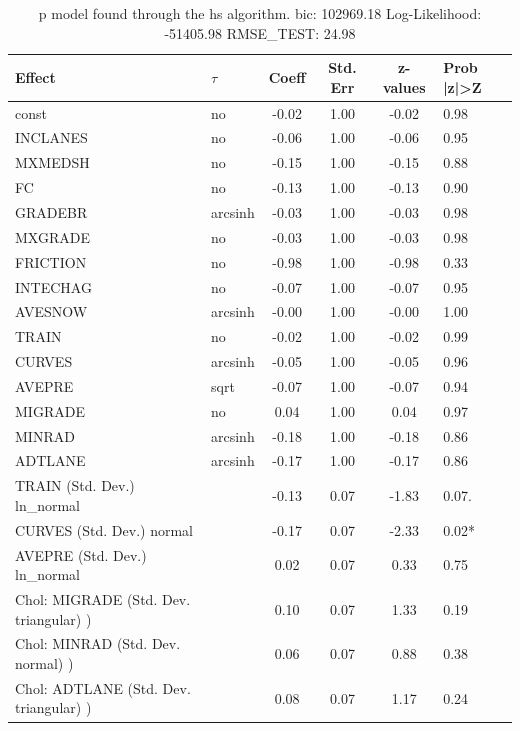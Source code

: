 \begin{table}
	\caption{p model found through the hs algorithm. bic: 102969.18 Log-Likelihood: -51405.98 RMSE_TEST: 24.98}
	\begin{center}
		\begin{tabular}{|l|l|c|c|c|l|}
			\hline
			Effect & $\tau$ & Coeff & Std. Err & z-values & Prob |z|>Z \\
			\hline
			const & no & -0.02 & 1.00 & -0.02 & 0.98 \\
			\hline
			INCLANES & no & -0.06 & 1.00 & -0.06 & 0.95 \\
			\hline
			MXMEDSH & no & -0.15 & 1.00 & -0.15 & 0.88 \\
			\hline
			FC & no & -0.13 & 1.00 & -0.13 & 0.90 \\
			\hline
			GRADEBR & arcsinh & -0.03 & 1.00 & -0.03 & 0.98 \\
			\hline
			MXGRADE & no & -0.03 & 1.00 & -0.03 & 0.98 \\
			\hline
			FRICTION & no & -0.98 & 1.00 & -0.98 & 0.33 \\
			\hline
			INTECHAG & no & -0.07 & 1.00 & -0.07 & 0.95 \\
			\hline
			AVESNOW & arcsinh & -0.00 & 1.00 & -0.00 & 1.00 \\
			\hline
			TRAIN & no & -0.02 & 1.00 & -0.02 & 0.99 \\
			\hline
			CURVES & arcsinh & -0.05 & 1.00 & -0.05 & 0.96 \\
			\hline
			AVEPRE & sqrt & -0.07 & 1.00 & -0.07 & 0.94 \\
			\hline
			MIGRADE & no & 0.04 & 1.00 & 0.04 & 0.97 \\
			\hline
			MINRAD & arcsinh & -0.18 & 1.00 & -0.18 & 0.86 \\
			\hline
			ADTLANE & arcsinh & -0.17 & 1.00 & -0.17 & 0.86 \\
			\hline
			TRAIN (Std. Dev.) ln_normal &  & -0.13 & 0.07 & -1.83 & 0.07. \\
			\hline
			CURVES (Std. Dev.) normal &  & -0.17 & 0.07 & -2.33 & 0.02* \\
			\hline
			AVEPRE (Std. Dev.) ln_normal &  & 0.02 & 0.07 & 0.33 & 0.75 \\
			\hline
			 Chol: MIGRADE (Std. Dev. triangular) ) &  & 0.10 & 0.07 & 1.33 & 0.19 \\
			\hline
			 Chol: MINRAD (Std. Dev. normal) ) &  & 0.06 & 0.07 & 0.88 & 0.38 \\
			\hline
			 Chol: ADTLANE (Std. Dev. triangular) ) &  & 0.08 & 0.07 & 1.17 & 0.24 \\

\end{tabular}
\end{center}
\end{table}
